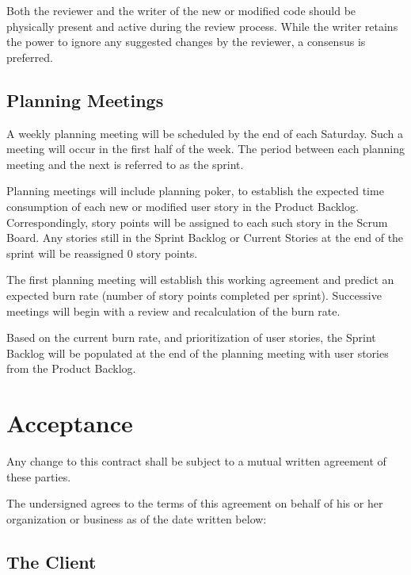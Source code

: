 \documentclass[a4paper,12pt]{article} %
\begin{document}
\begin{itemize}
Both the reviewer and the writer of the new or modified code should be physically present and active during the review process. While the writer retains the power to ignore any suggested changes by the reviewer, a consensus is preferred.

\subsection{Planning Meetings}
A weekly planning meeting will be scheduled by the end of each Saturday. Such a meeting will occur in the first half of the week. The period between each planning meeting and the next is referred to as the sprint.

Planning meetings will include planning poker, to establish the expected time consumption of each new or modified user story in the Product Backlog. Correspondingly, story points will be assigned to each such story in the Scrum Board. Any stories still in the Sprint Backlog or Current Stories at the end of the sprint will be reassigned 0 story points.

The first planning meeting will establish this working agreement and predict an expected burn rate (number of story points completed per sprint). Successive meetings will begin with a review and recalculation of the burn rate.

Based on the current burn rate, and prioritization of user stories, the Sprint Backlog will be populated at the end of the planning meeting with user stories from the Product Backlog.



\newpage %

\section{Acceptance}

Any change to this contract shall be subject to a mutual written agreement of these parties.

The undersigned agrees to the terms of this agreement on behalf of his or her organization or business as of the date written below:


\subsection*{The Client} %


\end{itemize}
\end{document}
